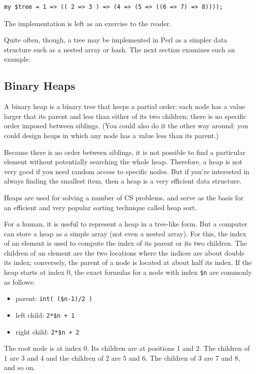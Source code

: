 \begin{verbatim}
my $tree = 1 => (( 2 => 3 ) => (4 => (5 => ((6 => 7) => 8))));
\end{verbatim}

The implementation is left as an exercise to the reader. 

Quite often, though, a tree may be implemented in Perl 
as a simpler data structure such as a nested array or hash. 
The next section examines such an example.

\subsection{Binary Heaps}
\label{heap}

A binary heap is a binary tree that keeps a partial order: each 
node has a value larger that its parent and less than 
either of its two children; there is no specific order imposed 
between siblings. (You could also do it the other way 
around: you could design heaps in which any node has a value 
less than its parent.)

Because there is no order between siblings, it is not possible 
to find a particular element without potentially searching the 
whole heap. Therefore, a heap is not very good if you need 
random access to specific nodes. But if you're interested 
in always finding the smallest item, then a heap is a 
very efficient data structure.

Heaps are used for solving a number of CS problems, and serve 
as the basis for an efficient and very popular sorting technique 
called heap sort.

For a human, it is useful to represent a heap in a tree-like 
form. But a computer can store a heap as a simple array (not 
even a nested array). For this, the index of an element is 
used to compute the index of its parent or its two children.
The children of an element are the two locations where the 
indices are about double its index; conversely, the parent 
of a node is located at about half its index. If the heap 
starts at index 0, the exact formulas for a node with index 
\verb'$n' are commonly as follows:
\begin{itemize}
\item parent: \verb'int( ($n-1)/2 )'
\item left child: \verb'2*$n + 1'
\item right child: \verb'2*$n + 2'
\end{itemize}
The root node is at index 0. Its children are at positions 
1 and 2. The children of 1 are 3 and 4 and the children of 
2 are 5 and 6. The children of 3 are 7 and 8, and so on.

